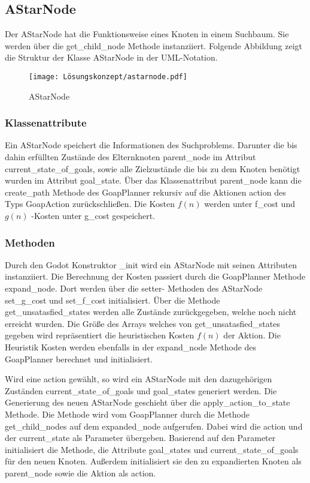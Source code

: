 \subsection{AStarNode}

Der AStarNode hat die Funktionsweise eines Knoten in einem Suchbaum. Sie werden über die get\_child\_node Methode instanziiert. Folgende Abbildung zeigt die Struktur der Klasse AStarNode in der UML-Notation.

\begin{figure}[h]
  \centering
  \texttt{[image: Lösungskonzept/astarnode.pdf]}
	\captionsetup{justification=justified, format=plain}
  \caption{AStarNode}
  \label{fig:AStarNode}
\end{figure}


\subsubsection{Klassenattribute}

Ein AStarNode speichert die Informationen des Suchproblems. Darunter die bis dahin erfüllten Zustände des Elternknoten parent\_node im Attribut current\_state\_of\_goals, sowie alle Zielzustände die bis zu dem Knoten benötigt wurden im Attribut goal\_state. Über das Klassenattribut parent\_node kann die create\_path Methode des GoapPlanner rekursiv auf die Aktionen action des Typs GoapAction zurückschließen. Die Kosten $f(n)$ werden unter f\_cost und $g(n)$ -Kosten unter g\_cost gespeichert.


\subsubsection{Methoden}

Durch den Godot Konstruktor \_init wird ein AStarNode mit seinen Attributen instanziiert. Die Berechnung der Kosten passiert durch die GoapPlanner Methode expand\_node. Dort werden über die setter- Methoden des AStarNode set\_g\_cost und set\_f\_cost initialisiert. Über die Methode get\_unsatasfied\_states werden alle Zustände zurückgegeben, welche noch nicht erreicht wurden. Die Größe des Arrays welches von get\_unsatasfied\_states gegeben wird repräsentiert die heuristischen Kosten $f(n)$ der Aktion. Die Heuristik Kosten werden ebenfalls in der expand\_node Methode des GoapPlanner berechnet und initialisiert.

Wird eine action gewählt, so wird ein AStarNode mit den dazugehörigen Zuständen current\_state\_of\_goals und goal\_states generiert werden. Die Generierung des neuen AStarNode geschieht über die apply\_action\_to\_state Methode. Die Methode wird vom GoapPlanner durch die Methode get\_child\_nodes auf dem expanded\_node aufgerufen. Dabei wird die action und der current\_state als Parameter übergeben. Basierend auf den Parameter initialisiert die Methode, die Attribute goal\_states und current\_state\_of\_goals für den neuen Knoten. Außerdem initialisiert sie den zu expandierten Knoten als parent\_node sowie die Aktion als action.

